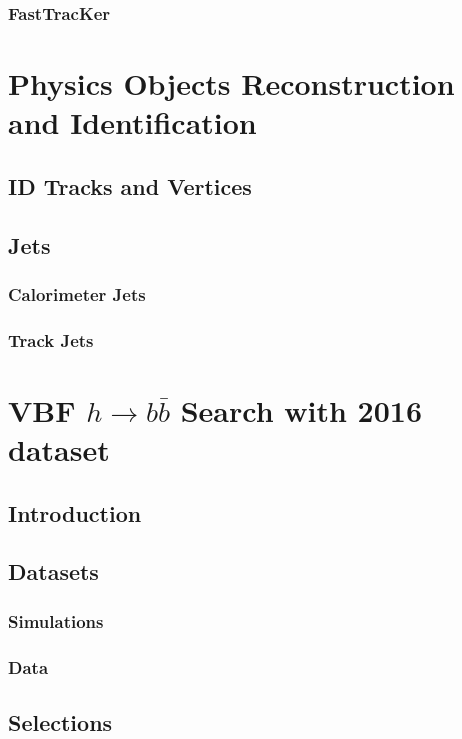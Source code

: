 \documentclass{report}
\begin{document}
\subsection{FastTracKer}

\chapter{Physics Objects Reconstruction and Identification}
\label{chap:reconstruction}
\section{ID Tracks and Vertices}
\section{Jets}
\subsection{Calorimeter Jets}
\subsection{Track Jets}

\chapter{VBF $h\rightarrow b\bar{b}$ Search with 2016 dataset}
\label{chap:vbf}
\section{Introduction}

\clearpage

\section{Datasets}
\subsection{Simulations}

\subsection{Data}

\clearpage

\section{Selections}
\end{document}

